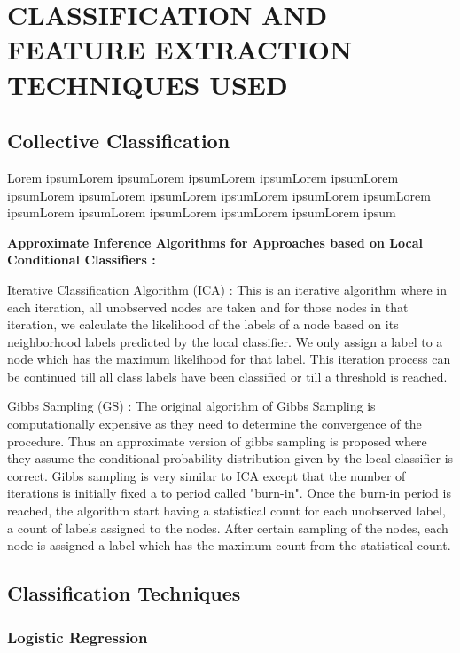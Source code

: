 \appendix
\label{app:class}
\chapter{CLASSIFICATION AND FEATURE EXTRACTION TECHNIQUES USED}
\section{Collective Classification}

\indent Lorem ipsumLorem ipsumLorem ipsumLorem ipsumLorem ipsumLorem ipsumLorem ipsumLorem ipsumLorem ipsumLorem ipsumLorem ipsumLorem ipsumLorem ipsumLorem ipsumLorem ipsumLorem ipsumLorem ipsum
\begin{flushleft}
\textbf{Approximate Inference Algorithms for Approaches based on Local Conditional Classifiers :}
\end{flushleft}

Iterative Classification Algorithm (ICA) : This is an iterative algorithm where in each iteration, all unobserved nodes are taken and for those nodes in that iteration, we calculate the likelihood of the labels of a node based on its neighborhood labels predicted by the local classifier. We only assign a label to a node which has the maximum likelihood for that label. This iteration process can be continued till all class labels have been classified or till a threshold is reached.

Gibbs Sampling (GS) : The original algorithm of Gibbs Sampling is computationally expensive as they need to determine the convergence of the procedure. Thus an approximate version of gibbs sampling is proposed where they assume the conditional probability distribution given by the local classifier is correct. Gibbs sampling is very similar to ICA except that the number of iterations is initially fixed a to period called "burn-in". Once the burn-in period is reached, the algorithm start having a statistical count for each unobserved label, a count of labels assigned to the nodes. After certain sampling of the nodes, each node is assigned a label which has the maximum count from the statistical count.

\section{Classification Techniques}

\subsection{Logistic Regression}
